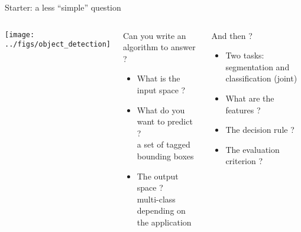   
\begin{frame}{Starter: a less ``simple'' question}
    \begin{columns}
      \begin{center}
        \texttt{[image: ../figs/object\_detection]}
      \end{center}
      \begin{block}{Can you write an algorithm to answer ? }
        \begin{itemize}
        \item What is the input space ? 
        \item What do you want to predict ? \\  a set of tagged bounding boxes
        \item The output space ?\\ multi-class depending on the application
        \end{itemize}
      \end{block}
      \begin{block}{And then ?}
      \pause
      \begin{itemize}
      \item Two tasks: segmentation and classification (joint)
      \item What are the features ? 
      \item The decision rule ?
      \item The evaluation criterion ? 
      \end{itemize}
    \end{block}
    \end{columns}
  \end{frame}

